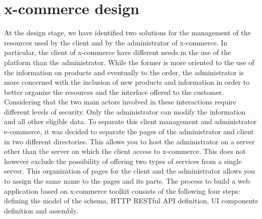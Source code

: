 \section{x-commerce design}
\label{sec:document_driven_web_development_process}
At the design stage, we have identified two solutions for the management of the resources used by the client and by the administrator of x-commerce. In particular, the client of x-commerce have different needs in the use of the platform than the administrator. While the former is more oriented to the use of the information on products and eventually to the order, the administrator is more concerned with the inclusion of new products and information in order to better organize the resources and the interface offered to the customer. Considering that the two main actors involved in these interactions require different levels of security. Only the administrator can modify the information and all other eligible data.
\newline
To separate this client management and administrator e-commerce, it was decided to separate the pages of the administrator and client in two different directories. This allows you to host the administrator on a server other than the server on which the client access to x-commerce. This does not however exclude the possibility of offering two types of services from a single server.
\newline
This organization of pages for the client and the administrator allows you to assign the same name to the pages and its parts.
\newline
The process to build a web application based on x-commerce toolkit consists of the following four steps: defining the model of the schema, HTTP RESTful API definition, UI components definition and assembly.
